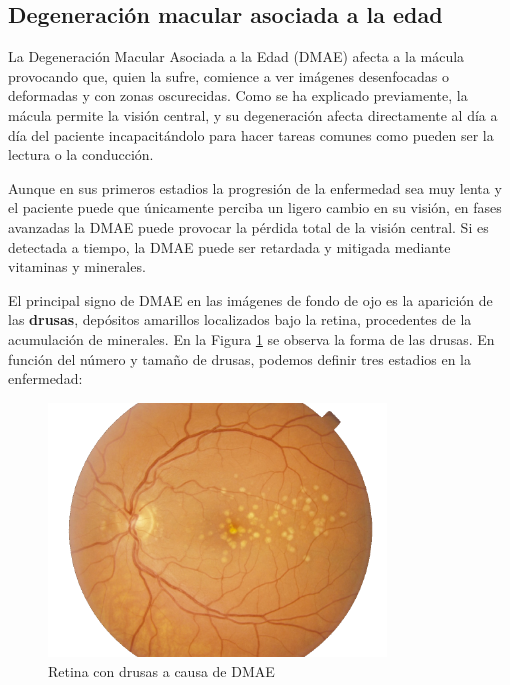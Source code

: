 \documentclass[
  12pt,
  spanish,
  a4paperpaper,
]{report}
\begin{document}
\hypertarget{degeneraciuxf3n-macular-asociada-a-la-edad}{%
\subsection{Degeneración macular asociada a la
edad}\label{degeneraciuxf3n-macular-asociada-a-la-edad}}

La Degeneración Macular Asociada a la Edad (DMAE) afecta a la mácula
provocando que, quien la sufre, comience a ver imágenes desenfocadas o
deformadas y con zonas oscurecidas. Como se ha explicado previamente, la
mácula permite la visión central, y su degeneración afecta directamente
al día a día del paciente incapacitándolo para hacer tareas comunes como
pueden ser la lectura o la conducción.

Aunque en sus primeros estadios la progresión de la enfermedad sea muy
lenta y el paciente puede que únicamente perciba un ligero cambio en su
visión, en fases avanzadas la DMAE puede provocar la pérdida total de la
visión central. Si es detectada a tiempo, la DMAE puede ser retardada y
mitigada mediante vitaminas y minerales.

El principal signo de DMAE en las imágenes de fondo de ojo es la
aparición de las \textbf{drusas}, depósitos amarillos localizados bajo
la retina, procedentes de la acumulación de minerales. En la Figura
\ref{drusen} se observa la forma de las drusas. En función del número y
tamaño de drusas, podemos definir tres estadios en la enfermedad:

\begin{figure}
\centering
\includegraphics[width=0.8\textwidth,height=\textheight]{source/figures/drusen.png}
\caption{Retina con drusas a causa de DMAE \label{drusen}}
\end{figure}
\end{document}
